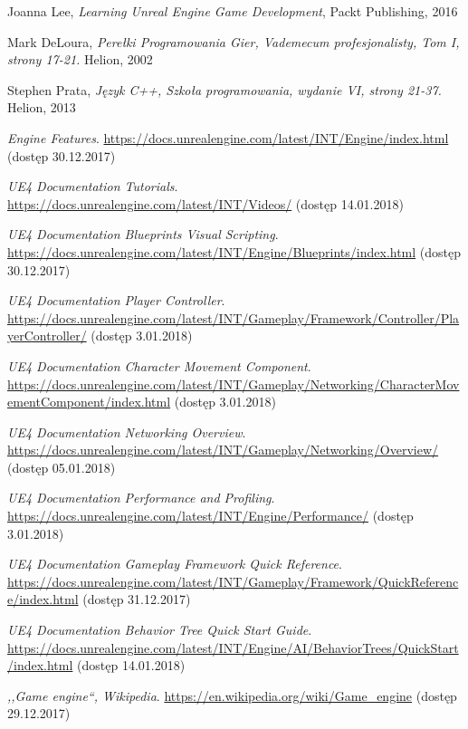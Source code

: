 \documentclass[multip]{SGGW-thesis}
\begin{document}
\begin{thebibliography}{9}

Joanna Lee, \textit{Learning Unreal Engine Game Development}, Packt Publishing, 2016

Mark DeLoura, \textit{Perełki Programowania Gier, Vademecum profesjonalisty, Tom I, strony 17-21.} Helion, 2002

Stephen Prata, \textit{Język C++, Szkoła programowania, wydanie VI, strony 21-37.} Helion, 2013

\textit{Engine Features}. \url{https://docs.unrealengine.com/latest/INT/Engine/index.html} (dostęp 30.12.2017)

\textit{UE4 Documentation Tutorials}. \url{https://docs.unrealengine.com/latest/INT/Videos/} (dostęp 14.01.2018)

\textit{UE4 Documentation Blueprints Visual Scripting}. \url{https://docs.unrealengine.com/latest/INT/Engine/Blueprints/index.html} (dostęp 30.12.2017)

\textit{UE4 Documentation Player Controller}. \url{https://docs.unrealengine.com/latest/INT/Gameplay/Framework/Controller/PlayerController/}  (dostęp 3.01.2018)

\textit{UE4 Documentation Character Movement Component}.  \url{https://docs.unrealengine.com/latest/INT/Gameplay/Networking/CharacterMovementComponent/index.html}  (dostęp 3.01.2018)

\textit{UE4 Documentation Networking Overview}. \url{https://docs.unrealengine.com/latest/INT/Gameplay/Networking/Overview/} (dostęp 05.01.2018)

\textit{UE4 Documentation Performance and Profiling}. \url{https://docs.unrealengine.com/latest/INT/Engine/Performance/}  (dostęp 3.01.2018)

\textit{UE4 Documentation Gameplay Framework Quick Reference}. \url{https://docs.unrealengine.com/latest/INT/Gameplay/Framework/QuickReference/index.html} (dostęp 31.12.2017)

\textit{UE4 Documentation Behavior Tree Quick Start Guide}. \url{https://docs.unrealengine.com/latest/INT/Engine/AI/BehaviorTrees/QuickStart/index.html} (dostęp 14.01.2018)

\textit{,,Game engine``, Wikipedia}. \url{https://en.wikipedia.org/wiki/Game_engine} {\mbox(dostęp 29.12.2017)}


\end{thebibliography}
\end{document}
